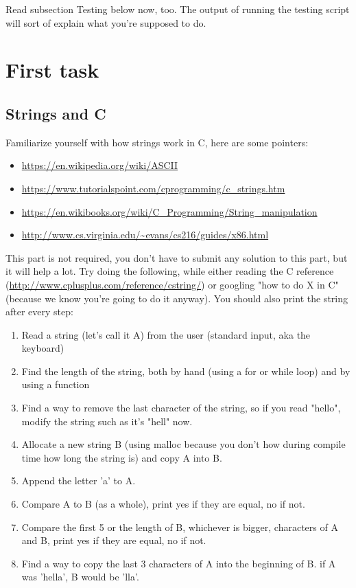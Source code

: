 \documentclass[11pt]{article}
\begin{document}
Read subsection Testing below now, too. The output of running the testing script will sort of explain what you're supposed to do.


\section{First task}
 
\subsection{Strings and C} 
 
 Familiarize yourself with how strings work in C, here are some pointers:
 
 \begin{itemize}
    \item \url{https://en.wikipedia.org/wiki/ASCII}
    \item \url{https://www.tutorialspoint.com/cprogramming/c_strings.htm}
    \item \url{https://en.wikibooks.org/wiki/C_Programming/String_manipulation}
    \item \url{http://www.cs.virginia.edu/~evans/cs216/guides/x86.html}
\end{itemize}
 
 This part is not required, you don't have to submit any solution to this part, 
 but it will help a lot. Try doing the following, while either reading the C reference (\url{http://www.cplusplus.com/reference/cstring/}) or googling "how to do X in C" (because
 we know you're going to do it anyway). You should also print the string after every step:

\begin{enumerate}
 \item Read a string (let's call it A) from the user (standard input, aka the keyboard)
 \item Find the length of the string, both by hand (using a for or while loop) and by using a function
 \item Find a way to remove the last character of the string, so if you read "hello", modify the string such as it's "hell" now.
 \item Allocate a new string B (using malloc because you don't how during compile time how long the string is) and copy A into B.
 \item Append the letter 'a' to A.
 \item Compare A to B (as a whole), print yes if they are equal, no if not.
 \item Compare the first 5 or the length of B, whichever is bigger, characters of A and B, print yes if they are equal, no if not.
 \item Find a way to copy the last 3 characters of A into the beginning of B. if A was 'hella', B would be 'lla'.
\end{enumerate}
\end{document}
